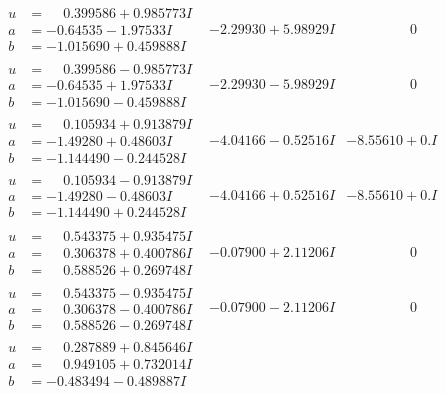 \documentclass[1p]{elsarticle_modified}
\theoremstyle{definition}
\begin{document}
$$\begin{array}{c|c|c}
\begin{aligned}
u &= \phantom{-}0.399586 + 0.985773 I \\
a &= -0.64535 - 1.97533 I \\
b &= -1.015690 + 0.459888 I\end{aligned}
 & -2.29930 + 5.98929 I & \phantom{-0.000000 } 0 \\ \hline\begin{aligned}
u &= \phantom{-}0.399586 - 0.985773 I \\
a &= -0.64535 + 1.97533 I \\
b &= -1.015690 - 0.459888 I\end{aligned}
 & -2.29930 - 5.98929 I & \phantom{-0.000000 } 0 \\ \hline\begin{aligned}
u &= \phantom{-}0.105934 + 0.913879 I \\
a &= -1.49280 + 0.48603 I \\
b &= -1.144490 - 0.244528 I\end{aligned}
 & -4.04166 - 0.52516 I & -8.55610 + 0. I\phantom{ +0.000000I} \\ \hline\begin{aligned}
u &= \phantom{-}0.105934 - 0.913879 I \\
a &= -1.49280 - 0.48603 I \\
b &= -1.144490 + 0.244528 I\end{aligned}
 & -4.04166 + 0.52516 I & -8.55610 + 0. I\phantom{ +0.000000I} \\ \hline\begin{aligned}
u &= \phantom{-}0.543375 + 0.935475 I \\
a &= \phantom{-}0.306378 + 0.400786 I \\
b &= \phantom{-}0.588526 + 0.269748 I\end{aligned}
 & -0.07900 + 2.11206 I & \phantom{-0.000000 } 0 \\ \hline\begin{aligned}
u &= \phantom{-}0.543375 - 0.935475 I \\
a &= \phantom{-}0.306378 - 0.400786 I \\
b &= \phantom{-}0.588526 - 0.269748 I\end{aligned}
 & -0.07900 - 2.11206 I & \phantom{-0.000000 } 0 \\ \hline\begin{aligned}
u &= \phantom{-}0.287889 + 0.845646 I \\
a &= \phantom{-}0.949105 + 0.732014 I \\
b &= -0.483494 - 0.489887 I\end{aligned}

\end{array}$$
\end{document}
